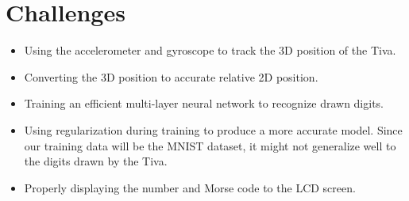 \documentclass[11pt]{article}
\begin{document}
\section*{Challenges}
\begin{itemize}
	\item Using the accelerometer and gyroscope to track the 3D position of the Tiva.
	\item Converting the 3D position to accurate relative 2D position.
	\item Training an efficient multi-layer neural network to recognize drawn digits.
	\item Using regularization during training to produce a more accurate model. Since our training data will be the MNIST dataset, it might not generalize well to the digits drawn by the Tiva.
	\item Properly displaying the number and Morse code to the LCD screen.
\end{itemize}
\end{document}
